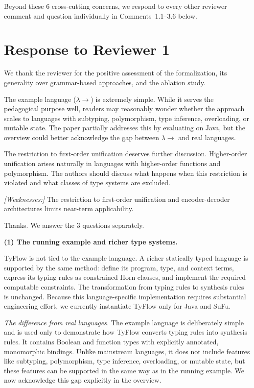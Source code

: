 \documentclass[11pt,a4paper]{article}
\newenvironment{revcomment}[1]{%
  \par\vspace{1.9em}\needspace{5\baselineskip}\noindent{\color{black!30}\hrule height 0.4pt}%
  \smallskip\par\noindent{\bfseries\color{accent}#1}\par\nopagebreak
  \vspace{2pt}%
  \begin{tcolorbox}[enhanced, breakable, frame hidden,
    colback=black!3, borderline west={1.6pt}{0pt}{accent!70},
    left=9pt, right=6pt, top=5pt, bottom=5pt,
    fontupper=\small\itshape, before skip=0pt, after skip=0pt,
    breakable, pad at break*=3pt]\setlength{\parskip}{0.3em}%
}{\end{tcolorbox}}
\newcommand{\response}{\par\medskip\needspace{3\baselineskip}\noindent{\bfseries\color{accent}Response.}%
  \par\nopagebreak\smallskip\ignorespaces}
\begin{document}
Beyond these 6 cross-cutting concerns, we respond to every other reviewer comment and question individually in Comments~1.1--3.6 below.

\clearpage
\section*{Response to Reviewer 1}

We thank the reviewer for the positive assessment of the formalization, its generality over grammar-based approaches, and the ablation study.

\label{com:1.1}
\begin{revcomment}{Comment 1.1.}
The example language ($\lambda\!\rightarrow$) is extremely simple. While it
serves the pedagogical purpose well, readers may reasonably wonder whether
the approach scales to languages with subtyping, polymorphism, type
inference, overloading, or mutable state. The paper partially addresses this
by evaluating on Java, but the overview could better acknowledge the gap
between $\lambda\!\rightarrow$ and real languages.\par\smallskip

The restriction to first-order unification deserves further discussion.
Higher-order unification arises naturally in languages with higher-order
functions and polymorphism. The authors should discuss what happens when
this restriction is violated and what classes of type systems are
excluded.\par\smallskip

\emph{[Weaknesses:]} The restriction to first-order unification and
encoder-decoder architectures limits near-term applicability.
\end{revcomment}

\response Thanks. We answer the 3 questions separately.

\textbf{(1) The running example and richer type systems.}

TyFlow is not tied to the example language. A richer statically typed language is supported by the same method: define its program, type, and context terms, express its typing rules as constrained Horn clauses, and implement the required computable constraints. The transformation from typing rules to synthesis rules is unchanged. Because this language-specific implementation requires substantial engineering effort, we currently instantiate TyFlow only for Java and SuFu.

\emph{The difference from real languages.} The example language is deliberately simple and is used only to demonstrate how TyFlow converts typing rules into synthesis rules. It contains Boolean and function types with explicitly annotated, monomorphic bindings. Unlike mainstream languages, it does not include features like subtyping, polymorphism, type inference, overloading, or mutable state, but these features can be supported in the same way as in the running example. We now acknowledge this gap explicitly in the overview.
\end{document}
